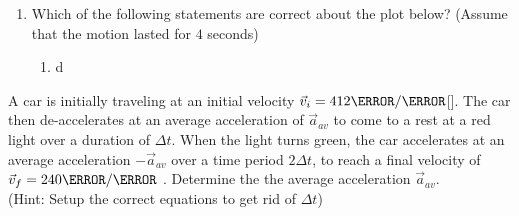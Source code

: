 \documentclass[12pt]{article} %
\newcommand{\tx}[1]{\text{#1}}
\begin{document}
\begin{qstn}[2]
\begin{enumerate}
        \item Which of the following statements are correct about the plot below? (Assume that the motion lasted for $4$ seconds)
            \begin{enumerate}[label = (\alph*)]
                \item d
            \end{enumerate}


    \end{enumerate}



 \end{qstn}




\begin{qstn}[3]
    A car is initially traveling at an initial velocity $\vec v_i = 412 \m / \s$[\tx{East}]. The car then de-accelerates at an average acceleration of $\vec a_{av}$ to come to a rest at a red light over a duration of $\Delta t$. When the light turns green, the car accelerates at an average acceleration $-\vec a_{av}$ over a time period $2\Delta t$, to reach a final velocity of $\vec v_f = 240 \m / \s$ \tx{[East]} . Determine the the average acceleration $\vec a_{av}$. \\(Hint: Setup the correct equations to get rid of $\Delta t$)
 \end{qstn}
\end{document}
